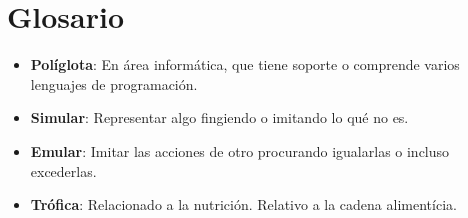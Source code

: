 \newpage
\section*{Glosario}
\begin{itemize}  
  \item \textbf{Políglota}: En área informática, que tiene soporte o comprende varios lenguajes de programación.  
  \item \textbf{Simular}: Representar algo fingiendo o imitando lo qué no es.
  \item \textbf{Emular}: Imitar las acciones de otro procurando igualarlas o incluso excederlas.
  \item \textbf{Trófica}: Relacionado a la nutrición. Relativo a la cadena alimentícia.
\end{itemize}
